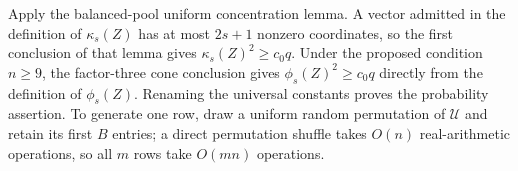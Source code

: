 Apply the balanced-pool uniform concentration lemma.  A vector admitted in the definition of \(\kappa_s(Z)\) has at most \(2s+1\) nonzero coordinates, so the first conclusion of that lemma gives \(\kappa_s(Z)^2\ge c_0q\).  Under the proposed condition \(n\ge9\), the factor-three cone conclusion gives \(\phi_s(Z)^2\ge c_0q\) directly from the definition of \(\phi_s(Z)\).  Renaming the universal constants proves the probability assertion.  To generate one row, draw a uniform random permutation of \(\mathcal U\) and retain its first \(B\) entries; a direct permutation shuffle takes \(O(n)\) real-arithmetic operations, so all \(m\) rows take \(O(mn)\) operations.